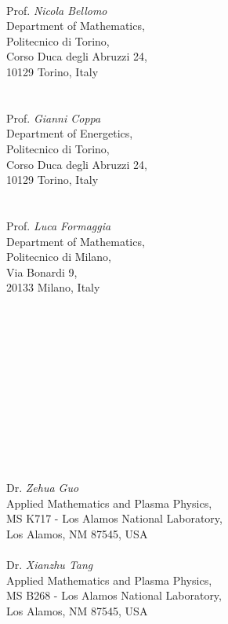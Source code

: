 \thispagestyle{empty}
~\\
Prof. \emph{Nicola Bellomo}\\
Department of Mathematics,\\
Politecnico di Torino,\\
Corso Duca degli Abruzzi 24,\\
10129 Torino, Italy\\
~\\
~\\
Prof. \emph{Gianni Coppa}\\
Department of Energetics,\\
Politecnico di Torino,\\
Corso Duca degli Abruzzi 24,\\
10129 Torino, Italy\\
~\\
~\\
Prof. \emph{Luca Formaggia}\\
Department of Mathematics,\\
Politecnico di Milano,\\
Via Bonardi 9,\\
20133 Milano, Italy\\
~\\
~\\
~\\
~\\
~\\
~\\
~\\
~\\
~\\
~\\
~\\
~\\
Dr. \emph{Zehua Guo}\\
Applied Mathematics and Plasma Physics,\\
MS K717 - Los Alamos National Laboratory,\\
Los Alamos, NM 87545, USA
~\\
~\\
Dr. \emph{Xianzhu Tang}\\
Applied Mathematics and Plasma Physics,\\
MS B268 - Los Alamos National Laboratory,\\
Los Alamos, NM 87545, USA

